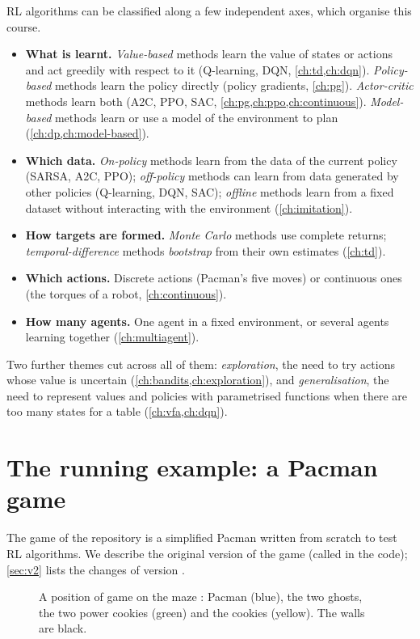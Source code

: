 RL algorithms can be classified along a few independent axes, which
organise this course.
\begin{itemize}
  \item \textbf{What is learnt.} \emph{Value-based} methods learn the value
    of states or actions and act greedily with respect to it (Q-learning,
    DQN, \cref{ch:td,ch:dqn}). \emph{Policy-based} methods learn the policy
    directly (policy gradients, \cref{ch:pg}). \emph{Actor-critic} methods
    learn both (A2C, PPO, SAC, \cref{ch:pg,ch:ppo,ch:continuous}).
    \emph{Model-based} methods learn or use a model of the environment to
    plan (\cref{ch:dp,ch:model-based}).
  \item \textbf{Which data.} \emph{On-policy} methods learn from the data of
    the current policy (SARSA, A2C, PPO); \emph{off-policy} methods can learn
    from data generated by other policies (Q-learning, DQN, SAC);
    \emph{offline} methods learn from a fixed dataset without interacting
    with the environment (\cref{ch:imitation}).
  \item \textbf{How targets are formed.} \emph{Monte Carlo} methods use
    complete returns; \emph{temporal-difference} methods \emph{bootstrap}
    from their own estimates (\cref{ch:td}).
  \item \textbf{Which actions.} Discrete actions (Pacman's five moves) or
    continuous ones (the torques of a robot, \cref{ch:continuous}).
  \item \textbf{How many agents.} One agent in a fixed environment, or
    several agents learning together (\cref{ch:multiagent}).
\end{itemize}
Two further themes cut across all of them: \emph{exploration}, the need to
try actions whose value is uncertain (\cref{ch:bandits,ch:exploration}),
and \emph{generalisation}, the need to represent values and policies with
parametrised functions when there are too many states for a table
(\cref{ch:vfa,ch:dqn}).

\section{The running example: a Pacman game}
\label{sec:game}

The game of the repository is a simplified Pacman written from scratch to
test RL algorithms. We describe the original version of the game (called
 in the code); \cref{sec:v2} lists the changes of version .

\begin{figure}[ht]
  \centering
  
  \caption{A position of game  on the maze :
    Pacman (blue), the two ghosts, the two power cookies (green) and the
    cookies (yellow). The walls are black.}
  \label{fig:board}
\end{figure}

